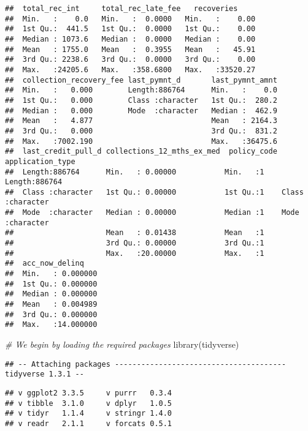 \documentclass[
]{article}
\newenvironment{Shaded}{\begin{snugshade}}{\end{snugshade}}
\newcommand{\CommentTok}[1]{\textcolor[rgb]{0.56,0.35,0.01}{\textit{#1}}}
\newcommand{\FunctionTok}[1]{\textcolor[rgb]{0.00,0.00,0.00}{#1}}
\newcommand{\NormalTok}[1]{#1}
\begin{document}
\begin{verbatim}
##  total_rec_int     total_rec_late_fee   recoveries      
##  Min.   :    0.0   Min.   :  0.0000   Min.   :    0.00  
##  1st Qu.:  441.5   1st Qu.:  0.0000   1st Qu.:    0.00  
##  Median : 1073.6   Median :  0.0000   Median :    0.00  
##  Mean   : 1755.0   Mean   :  0.3955   Mean   :   45.91  
##  3rd Qu.: 2238.6   3rd Qu.:  0.0000   3rd Qu.:    0.00  
##  Max.   :24205.6   Max.   :358.6800   Max.   :33520.27  
##  collection_recovery_fee last_pymnt_d       last_pymnt_amnt  
##  Min.   :   0.000        Length:886764      Min.   :    0.0  
##  1st Qu.:   0.000        Class :character   1st Qu.:  280.2  
##  Median :   0.000        Mode  :character   Median :  462.9  
##  Mean   :   4.877                           Mean   : 2164.3  
##  3rd Qu.:   0.000                           3rd Qu.:  831.2  
##  Max.   :7002.190                           Max.   :36475.6  
##  last_credit_pull_d collections_12_mths_ex_med  policy_code application_type  
##  Length:886764      Min.   : 0.00000           Min.   :1    Length:886764     
##  Class :character   1st Qu.: 0.00000           1st Qu.:1    Class :character  
##  Mode  :character   Median : 0.00000           Median :1    Mode  :character  
##                     Mean   : 0.01438           Mean   :1                      
##                     3rd Qu.: 0.00000           3rd Qu.:1                      
##                     Max.   :20.00000           Max.   :1                      
##  acc_now_delinq     
##  Min.   : 0.000000  
##  1st Qu.: 0.000000  
##  Median : 0.000000  
##  Mean   : 0.004989  
##  3rd Qu.: 0.000000  
##  Max.   :14.000000
\end{verbatim}

\begin{Shaded}
\begin{Highlighting}[]
\CommentTok{\# We begin by loading the required packages}
\FunctionTok{library}\NormalTok{(tidyverse)}
\end{Highlighting}
\end{Shaded}

\begin{verbatim}
## -- Attaching packages --------------------------------------- tidyverse 1.3.1 --
\end{verbatim}

\begin{verbatim}
## v ggplot2 3.3.5     v purrr   0.3.4
## v tibble  3.1.0     v dplyr   1.0.5
## v tidyr   1.1.4     v stringr 1.4.0
## v readr   2.1.1     v forcats 0.5.1
\end{verbatim}
\end{document}
